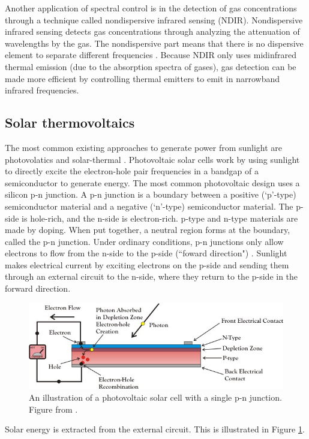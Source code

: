 \documentclass[%
 reprint,
 amsmath,amssymb,
 aps
]{revtex4-2}
\begin{document}
Another application of spectral control is in the detection of gas concentrations through a technique called nondispersive infrared sensing (NDIR). Nondispersive infrared sensing detects gas concentrations through analyzing the attenuation of wavelengths by the gas. The nondispersive part means that there is no dispersive element to separate different frequencies \cite{gas_detection}. Because NDIR only uses midinfrared thermal emission (due to the absorption spectra of gases), gas detection can be made more efficient by controlling thermal emitters to emit in narrowband infrared frequencies.

\subsection{Solar thermovoltaics}
The most common existing approaches to generate power from sunlight are photovolatics and solar-thermal \cite{lenert}. Photovoltaic solar cells work by using sunlight to directly excite the electron-hole pair frequencies in a bandgap of a semiconductor to generate energy. The most common photovoltaic design uses a silicon p-n junction. A p-n junction is a boundary between a positive (`p'-type) semiconductor material and a negative (`n'-type) semiconductor material. The p-side is hole-rich, and the n-side is electron-rich. p-type and n-type materials are made by doping. When put together, a neutral region forms at the boundary, called the p-n junction. Under ordinary conditions, p-n junctions only allow electrons to flow from the n-side to the p-side (``foward direction") \cite{famu}. Sunlight makes electrical current by exciting electrons on the p-side and sending them through an external circuit to the n-side, where they return to the p-side in the forward direction. 
\begin{figure}
\centering
\includegraphics[width=0.8\linewidth]{solarcellW.jpg}
\caption{An illustration of a photovoltaic solar cell with a single p-n junction. Figure from \cite{photovolt}.}\label{junction}
\end{figure} Solar energy is extracted from the external circuit. This is illustrated in Figure \ref{junction}.
\end{document}
